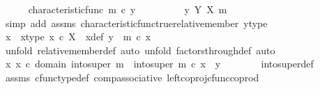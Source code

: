 \begin{isabellebody}
\ \ \ \ \isamarkupfalse%
\ {\isachardoublequoteopen}characteristic{\isacharunderscore}{\kern0pt}func\ m\ {\isasymcirc}\isactrlsub c\ y\ {\isacharequal}{\kern0pt}\ {\isasymt}{\isachardoublequoteclose}\isanewline
\ \ \ \ \isamarkupfalse%
\ \isamarkupfalse%
\ {\isachardoublequoteopen}y\ {\isasymin}\isactrlbsub Y\isactrlesub \ {\isacharparenleft}{\kern0pt}X{\isacharcomma}{\kern0pt}\ m{\isacharparenright}{\kern0pt}{\isachardoublequoteclose}\isanewline
\ \ \ \ \ \ \isamarkupfalse%
\ {\isacharparenleft}{\kern0pt}simp\ add{\isacharcolon}{\kern0pt}\ assms\ characteristic{\isacharunderscore}{\kern0pt}func{\isacharunderscore}{\kern0pt}true{\isacharunderscore}{\kern0pt}relative{\isacharunderscore}{\kern0pt}member\ y{\isacharunderscore}{\kern0pt}type{\isacharparenright}{\kern0pt}\isanewline
\ \ \ \ \isamarkupfalse%
\ \isamarkupfalse%
\ x\ \ x{\isacharunderscore}{\kern0pt}type{\isacharcolon}{\kern0pt}\ {\isachardoublequoteopen}x\ {\isasymin}\isactrlsub c\ X{\isachardoublequoteclose}\ \ x{\isacharunderscore}{\kern0pt}def{\isacharcolon}{\kern0pt}\ {\isachardoublequoteopen}y\ {\isacharequal}{\kern0pt}\ m\ {\isasymcirc}\isactrlsub c\ x{\isachardoublequoteclose}\isanewline
\ \ \ \ \ \ \isamarkupfalse%
\ {\isacharparenleft}{\kern0pt}unfold\ relative{\isacharunderscore}{\kern0pt}member{\isacharunderscore}{\kern0pt}def{}{\isacharcomma}{\kern0pt}\ auto{\isacharcomma}{\kern0pt}\ unfold\ factors{\isacharunderscore}{\kern0pt}through{\isacharunderscore}{\kern0pt}def{}{\isacharcomma}{\kern0pt}\ auto{\isacharparenright}{\kern0pt}\isanewline
\ \ \ \ \isamarkupfalse%
\ \isamarkupfalse%
\ {\isachardoublequoteopen}{\isasymexists}x{\isachardot}{\kern0pt}\ x\ {\isasymin}\isactrlsub c\ domain\ {\isacharparenleft}{\kern0pt}into{\isacharunderscore}{\kern0pt}super\ m{\isacharparenright}{\kern0pt}\ {\isasymand}\ into{\isacharunderscore}{\kern0pt}super\ m\ {\isasymcirc}\isactrlsub c\ x\ {\isacharequal}{\kern0pt}\ y{\isachardoublequoteclose}\isanewline
\ \ \ \ \ \ \isamarkupfalse%
\ into{\isacharunderscore}{\kern0pt}super{\isacharunderscore}{\kern0pt}def\ \isamarkupfalse%
\ assms\ cfunc{\isacharunderscore}{\kern0pt}type{\isacharunderscore}{\kern0pt}def\ comp{\isacharunderscore}{\kern0pt}associative\ left{\isacharunderscore}{\kern0pt}coproj{\isacharunderscore}{\kern0pt}cfunc{\isacharunderscore}{\kern0pt}coprod\isanewline
\ \ \ \ \ \ \isamarkupfalse%

\end{isabellebody}
